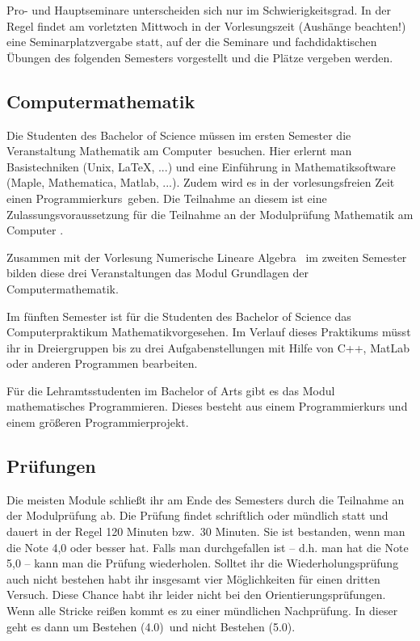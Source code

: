 Pro- und Hauptseminare unterscheiden sich nur im Schwierigkeitsgrad. 
In der Regel findet am vorletzten Mittwoch
in der Vorlesungszeit (Aushänge beachten!)  eine Seminarplatzvergabe statt,
auf der die Seminare und fachdidaktischen Übungen des folgenden
Semesters vorgestellt und die Plätze vergeben werden.

\subsection{Computermathematik}

Die Studenten des Bachelor of Science
müssen im ersten Semester die Veranstaltung
\glqq Mathematik am Computer\grqq~besuchen.
Hier erlernt man Basistechniken (Unix, \LaTeX, ...)
und eine Einführung in Mathematiksoftware (Maple, Mathematica, Matlab, ...).
Zudem wird es in der vorlesungsfreien Zeit
einen \glqq Programmierkurs\grqq\ geben.
Die Teilnahme an diesem ist eine Zulassungsvoraussetzung
für die Teilnahme an der Modulprüfung \glqq Mathematik am Computer \grqq.

Zusammen mit der Vorlesung \glqq Numerische Lineare Algebra\grqq
~im zweiten Semester bilden diese drei Veranstaltungen das Modul
\glqq Grundlagen der Computermathematik\grqq.

Im fünften Semester ist für die Studenten
des Bachelor of Science das \glqq Computerpraktikum Mathematik\grqq vorgesehen.
Im Verlauf dieses Praktikums müsst ihr in Dreiergruppen
bis zu drei Aufgabenstellungen mit Hilfe
von C++, MatLab oder anderen Programmen bearbeiten.

Für die Lehramtsstudenten im Bachelor of Arts
gibt es das Modul \glqq mathematisches Programmieren\grqq.
Dieses besteht aus einem Programmierkurs und einem größeren Programmierprojekt.

\subsection{Prüfungen}

Die meisten Module schließt ihr am Ende
des Semesters durch die Teilnahme
an der Modulprüfung ab.
Die Prüfung findet schriftlich oder mündlich statt
und dauert in der Regel 120 Minuten bzw.\ 30 Minuten.
Sie ist bestanden, wenn man die Note 4,0 oder besser hat.
Falls man durchgefallen ist -- d.h. man hat die Note 5,0 --
kann man die Prüfung wiederholen.
Solltet ihr die Wiederholungsprüfung auch nicht bestehen
habt ihr insgesamt vier Möglichkeiten für einen dritten Versuch.
Diese Chance habt ihr leider nicht bei den Orientierungsprüfungen.
Wenn alle Stricke reißen kommt es zu einer mündlichen Nachprüfung.
In dieser geht es dann um \glqq Bestehen (4.0)\grqq \
und \glqq nicht Bestehen (5.0)\grqq. 

